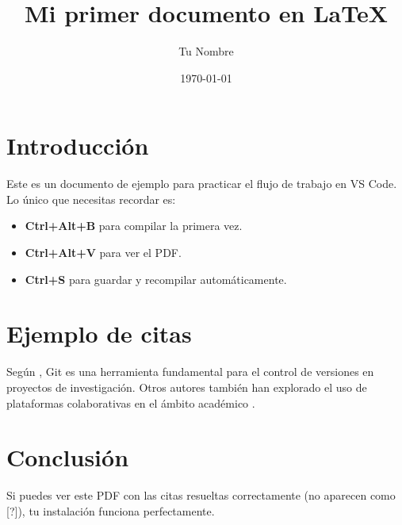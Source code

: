 \documentclass[12pt,a4paper]{article}
\title{Mi primer documento en \LaTeX}
\author{Tu Nombre}
\date{\today}
\begin{document}
\maketitle

\section{Introducción}

Este es un documento de ejemplo para practicar el flujo de trabajo en VS Code.
Lo único que necesitas recordar es:

\begin{itemize}
    \item \textbf{Ctrl+Alt+B} para compilar la primera vez.
    \item \textbf{Ctrl+Alt+V} para ver el PDF.
    \item \textbf{Ctrl+S} para guardar y recompilar automáticamente.
\end{itemize}

\section{Ejemplo de citas}

Según \citet{chacon2014pro}, Git es una herramienta fundamental para el control de versiones en proyectos de investigación. Otros autores también han explorado el uso de plataformas colaborativas en el ámbito académico \citep{perez2024github}.

\section{Conclusión}

Si puedes ver este PDF con las citas resueltas correctamente (no aparecen como [?]), tu instalación funciona perfectamente.



\end{document}

